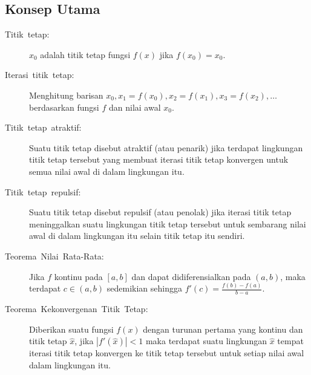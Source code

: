 \subsection{Konsep Utama}
\begin{description}
\item [{Titik~tetap:}] $x_{0}$ adalah titik tetap fungsi $f(x)$ jika
$f(x_{0})=x_{0}$.
\item [{Iterasi~titik~tetap:}]  Menghitung
barisan $x_{0},x_{1}=f(x_{0}),x_{2}=f(x_{1}),x_{3}=f(x_{2}),\ldots$
berdasarkan fungsi $f$ dan nilai awal $x_{0}$.
\item [{Titik~tetap~atraktif:}] Suatu titik tetap disebut 
atraktif (atau penarik) jika terdapat lingkungan titik tetap tersebut
yang membuat iterasi titik tetap konvergen untuk semua nilai awal
di dalam lingkungan itu.
\item [{Titik~tetap~repulsif:}] Suatu titik tetap disebut 
repulsif (atau penolak) jika iterasi titik tetap meninggalkan suatu
lingkungan titik tetap tersebut untuk sembarang nilai awal di dalam
lingkungan itu selain titik tetap itu sendiri.
\item [{Teorema~Nilai~Rata-Rata:}] Jika
$f$ kontinu pada $[a,b]$ dan dapat didiferensialkan pada $(a,b)$,
maka terdapat $c\in(a,b)$ sedemikian sehingga $f'(c)=\frac{f(b)-f(a)}{b-a}$.
\item [{Teorema~Kekonvergenan~Titik~Tetap:}] 
Diberikan suatu fungsi $f(x)$ dengan turunan pertama yang kontinu
dan titik tetap $\hat{x}$, jika $|f'(\hat{x})|<1$ maka terdapat
suatu lingkungan $\hat{x}$ tempat iterasi titik tetap konvergen ke
titik tetap tersebut untuk setiap nilai awal dalam lingkungan itu.
\end{description}
\startexercises

